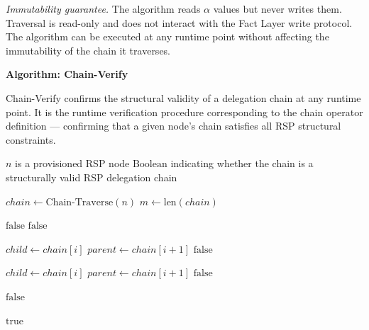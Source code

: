 \textit{Immutability guarantee.} The algorithm reads $\alpha$ values but never writes them. Traversal is read-only and does not interact with the Fact Layer write protocol. The algorithm can be executed at any runtime point without affecting the immutability of the chain it traverses.

\medskip
\noindent\textbf{Algorithm: Chain-Verify}

Chain-Verify confirms the structural validity of a delegation chain at any runtime point. It is the runtime verification procedure corresponding to the chain operator definition — confirming that a given node's chain satisfies all RSP structural constraints.

\begin{algorithm}
\caption{Chain-Verify($n$) — Verify that node $n$ terminates at a human anchor via a valid RSP chain}
\label{alg:chain-verify}
\begin{algorithmic}[1]
\REQUIRE $n$ is a provisioned RSP node
\ENSURE $\text{Boolean}$ indicating whether the chain is a structurally valid RSP delegation chain

\STATE $chain \leftarrow \text{Chain-Traverse}(n)$
\STATE $m \leftarrow \text{len}(chain)$

\STATE {}
    \STATE \RETURN $\text{false}$ 
\ENDIF
{}
    \STATE \RETURN $\text{false}$ 
\ENDIF

\STATE {}
    \STATE $child \leftarrow chain[i]$
    \STATE $parent \leftarrow chain[i+1]$
        \STATE \RETURN $\text{false}$ 
    \ENDIF
\ENDFOR

\STATE {}
    \STATE $child \leftarrow chain[i]$
    \STATE $parent \leftarrow chain[i+1]$
        \STATE \RETURN $\text{false}$ 
    \ENDIF
\ENDFOR

\STATE {}
        \STATE \RETURN $\text{false}$ 
    \ENDIF
\ENDFOR

\RETURN $\text{true}$
\end{algorithmic}
\end{algorithm}

